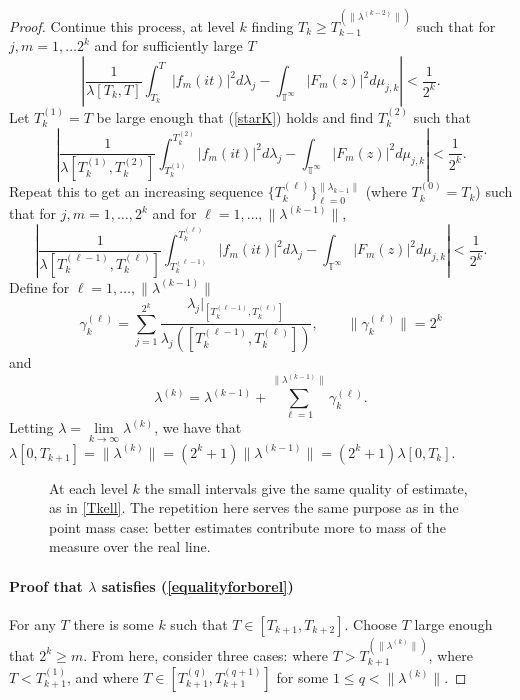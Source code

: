\documentclass[]{elsarticle}
\newcommand{\T}{\mathbb{T}}
\numberwithin{equation}{section}
\begin{document}
\begin{proof}
      Continue this process, at level $k$ finding $T_k\geq T_{k-1}^{(\|\lambda^{(k-2)}\|)} $ such that for $j,m=1, \dots 2^k$ and for sufficiently large $T$
      \begin{equation}\label{starK}
        \left|\frac{1}{\lambda[T_k,T]}\int_{T_k}^{T}|f_m(it)|^2d\lambda_j - \int_{\T^{\infty}}|F_m(z)|^2d\mu_{j,k}\right|<\frac{1}{2^k}.
      \end{equation}
      Let $T_k^{(1)}=T$ be large enough that (\ref{starK}) holds and find $T_k^{(2)}$ such that
      \begin{equation*}
        \left|\frac{1}{\lambda[T_k^{(1)},T_k^{(2)}]}\int_{T_k^{(1)}}^{T_k^{(2)}}|f_m(it)|^2d\lambda_j - \int_{\T^{\infty}}|F_m(z)|^2d\mu_{j,k}\right|<\frac{1}{2^k}.
      \end{equation*}
      Repeat this to get an increasing sequence $\{T_k^{(\ell)}\}_{\ell=0}^{\|\lambda_{k-1}\|}$ (where $T_k^{(0)}=T_k$) such that for $j,m=1,\dots,2^k$ and for $\ell=1,\dots,\|\lambda^{(k-1)}\|$,
      \begin{equation}\label{Tkell}
        \left|\frac{1}{\lambda[T_k^{(\ell-1)},T_k^{(\ell)}]}\int_{T_k^{(\ell-1)}}^{T_k^{(\ell)}}|f_m(it)|^2d\lambda_j - \int_{\T^{\infty}}|F_m(z)|^2d\mu_{j,k}\right|<\frac{1}{2^k}.
      \end{equation}
      Define for $\ell=1,\dots,\|\lambda^{(k-1)}\|$
      \begin{equation*}
        \gamma_k^{(\ell)} = \sum_{j=1}^{2^k}\frac{\lambda_j|_{[T_k^{(\ell-1)},T_k^{(\ell)}]}}{\lambda_j([T_k^{(\ell-1)},T_k^{(\ell)}])},\qquad \|\gamma_k^{(\ell)}\|=2^k
      \end{equation*}
      and 
        $$\lambda^{(k)}= \lambda^{(k-1)}+ \sum_{\ell =1}^{\|\lambda^{(k-1)}\|}\gamma_k^{(\ell)}.$$
      Letting $\lambda = \lim\limits_{k\to\infty} \lambda^{(k)}$, we have that $\lambda[0, T_{k+1}] = \|\lambda^{(k)}\| = (2^k+1)\|\lambda^{(k-1)}\|= (2^k+1)\lambda[0,T_k]$.
      \begin{figure}[H]\label{fig:BorelDistr}
        \centering
        
        \caption[Construction of the Borel measure]{At each level $k$ the small intervals give the same quality of estimate, as in \eqref{Tkell}. The repetition here serves the same purpose as in the point mass case: better estimates contribute more to mass of the measure over the real line.}
      \end{figure}
      \paragraph{Proof that $\lambda$ satisfies (\ref{equalityforborel})} 
      For any $T$ there is some $k$ such that $T\in [T_{k+1}, T_{k+2}]$. Choose $T$ large enough that $2^{k}\geq m$. From here, consider three cases: where $T>T_{k+1}^{(\|\lambda^{(k)}\|)}$, where $T<T_{k+1}^{(1)}$, and where $T\in [T_{k+1}^{(q)}, T_{k+1}^{(q+1)}]$ for some $1\leq q < \|\lambda^{(k)}\| $.


\end{proof}
\end{document}
